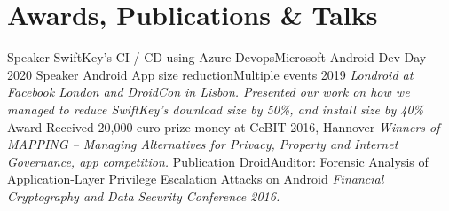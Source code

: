 \documentclass[]{friggeri-cv}
\begin{document}
\section{Awards, Publications \& Talks}
	\begin{entrylist}
        \entry
            {Speaker}
            {SwiftKey’s CI / CD using Azure Devops}{Microsoft Android Dev Day 2020}
            {}
        \entry
            {Speaker}
            {Android App size reduction}{Multiple events 2019}
            {\emph{Londroid at Facebook London and DroidCon in Lisbon. Presented our work on how we managed to reduce SwiftKey's download size by 50\%, and install size by 40\%}}
        \entry
            {Award}
            {Received 20,000 euro prize money at CeBIT 2016, Hannover}{}
            {\emph{Winners of MAPPING -- Managing Alternatives for Privacy, Property and Internet Governance, app competition.}}
        \entry
            {Publication}
            {DroidAuditor: Forensic Analysis of Application-Layer Privilege Escalation Attacks on Android}{}
            {\emph{Financial Cryptography and Data Security Conference 2016.}}        
	\end{entrylist}
\end{document}
